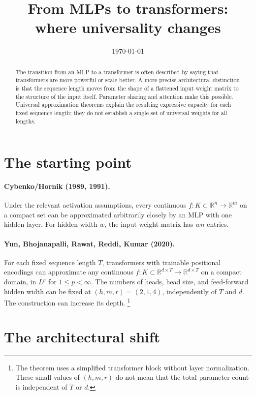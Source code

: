 \documentclass[11pt]{article}
\title{From MLPs to transformers:\\
       where universality changes}
\author{}
\date{\today}
\begin{document}
\maketitle

\begin{abstract}
The transition from an MLP to a transformer is often described by saying
that transformers are more powerful or scale better. A more precise
architectural distinction is that the sequence length moves from the shape
of a flattened input weight matrix to the structure of the input itself.
Parameter sharing and attention make this possible. Universal approximation
theorems explain the resulting expressive capacity for each fixed sequence
length; they do not establish a single set of universal weights for all lengths.
\end{abstract}

\section{The starting point}

\paragraph{Cybenko/Hornik (1989, 1991).}
Under the relevant activation assumptions, every continuous
$f:K\subset\mathbb R^n\to\mathbb R^m$ on a compact set can be
approximated arbitrarily closely by an MLP with one hidden layer.
For hidden width $w$, the input weight matrix has $wn$ entries.

\paragraph{Yun, Bhojanapalli, Rawat, Reddi, Kumar (2020).}
For each fixed sequence length $T$, transformers with trainable positional
encodings can approximate any continuous
$f:K\subset\mathbb R^{d\times T}\to\mathbb R^{d\times T}$ on a compact
domain, in $L^p$ for $1\le p<\infty$. The numbers of heads, head size,
and feed-forward hidden width can be fixed at $(h,m,r)=(2,1,4)$,
independently of $T$ and $d$. The construction can increase its depth.
\footnote{The theorem uses a simplified transformer block without layer
normalization. These small values of $(h,m,r)$ do not mean that the
total parameter count is independent of $T$ or $d$.}

\section{The architectural shift}
\end{document}
